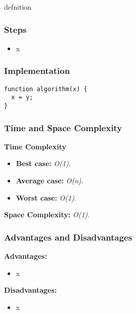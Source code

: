 defnition

\subsubsection*{Steps}

\begin{itemize}
  \item x
\end{itemize}

\subsubsection*{Implementation}

\begin{lstlisting}[style=general]
function algorithm(x) {
  x = y;
}
\end{lstlisting}

\subsubsection*{Time and Space Complexity}

\textbf{Time Complexity}

\begin{itemize}
  \item \textbf{Best case:} \textit{O(1)}.
  \item \textbf{Average case:} \emph{O(n)}.
  \item \textbf{Worst case:} \textit{O(1)}.
\end{itemize}

\textbf{Space Complexity:} \textit{O(1)}.

\subsubsection*{Advantages and Disadvantages}

\textbf{Advantages:}

\begin{itemize}
  \item x
\end{itemize}

\textbf{Disadvantages:}

\begin{itemize}
  \item x
\end{itemize}
